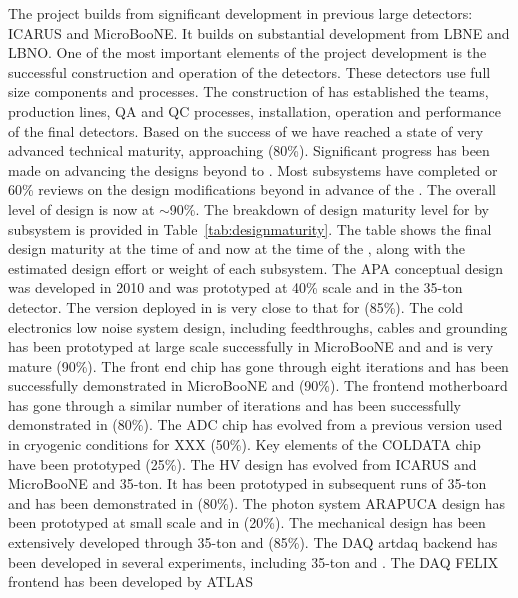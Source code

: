 The  project builds from significant development in
previous large  detectors: ICARUS and MicroBooNE. It
builds on substantial development from LBNE and LBNO. One of the most
important elements of the project development is the successful
construction and operation of the  detectors. These detectors
use full size  components and processes. The construction of
 has established the teams, production lines, QA and QC
processes, installation, operation and performance of the final
 detectors. Based on the success of  we have
reached a state of very advanced technical maturity, approaching
(80\%). Significant progress has been made on advancing the designs
beyond  to . Most subsystems have completed 
or 60\% reviews on the design modifications beyond  in
advance of the . The overall level of design is now at
$\sim$90\%. The breakdown of design maturity level for  by
subsystem is provided in Table~\ref{tab:designmaturity}. The table
shows the final  design maturity at the time of  and now
at the time of the , along with the estimated design effort or
weight of each subsystem. The APA conceptual design was developed in
2010 and was prototyped at 40\% scale and in the 35-ton detector. The
version deployed in  is very close to that for 
(85\%). The cold electronics low noise system design, including
feedthroughs, cables and grounding has been prototyped at large scale
successfully in MicroBooNE and  and is very mature
(90\%). The front end chip has gone through eight iterations and has
been successfully demonstrated in MicroBooNE and 
(90\%). The frontend motherboard has gone through a similar number of
iterations and has been successfully demonstrated in 
(80\%). The ADC chip has evolved from a previous version used in
cryogenic conditions for XXX (50\%). Key elements of the COLDATA chip
have been prototyped (25\%). The HV design has evolved from ICARUS and
MicroBooNE and 35-ton. It has been prototyped in subsequent runs of
35-ton and has been demonstrated in  (80\%). The photon
system ARAPUCA design has been prototyped at small scale and in
 (20\%). The mechanical design has been extensively
developed through 35-ton and  (85\%). The DAQ artdaq
backend has been developed in several experiments, including 35-ton
and . The DAQ FELIX frontend has been developed by ATLAS
